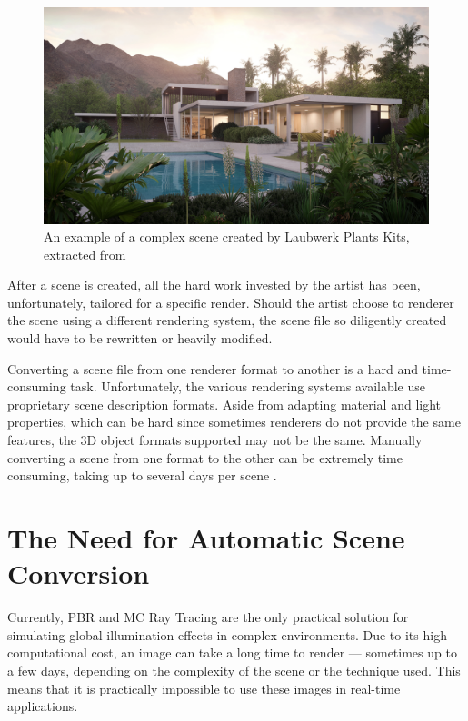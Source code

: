 \begin{figure}[h]
  
\includegraphics[width=\textwidth,height=\textheight,keepaspectratio]{images/1_introduction/Laubwerk-Kit-12_Bauclassroom-Exterior.jpg}
  \caption{An example of a complex scene created by Laubwerk Plants Kits, extracted from \cite{laubwerk}}
  \label{fig:intro_complexScene}
\end{figure}

After a scene is created, all the hard work invested by the artist has been, unfortunately, tailored for a specific render. 
Should the artist choose to renderer the scene using a different rendering system, the scene file so diligently created would have to be 
rewritten or heavily modified.

Converting a scene file from one renderer format to another is a hard and time-consuming task. Unfortunately, the various rendering systems available use proprietary scene description formats. Aside from adapting material and light properties, which can be hard since sometimes renderers do not provide the same features, the 3D object formats supported may not be the same. Manually converting a scene from one format to the other can be extremely time consuming, taking up to several days per scene \cite{tungsten}.


\section{The Need for Automatic Scene Conversion}

Currently, PBR and MC Ray Tracing are the only practical solution for simulating global illumination effects in complex environments. Due to its high computational cost, an image can take a long time to render --- sometimes up to a few days, depending on the complexity of the scene or the technique used. This means that it is practically impossible to use these images in real-time applications.

